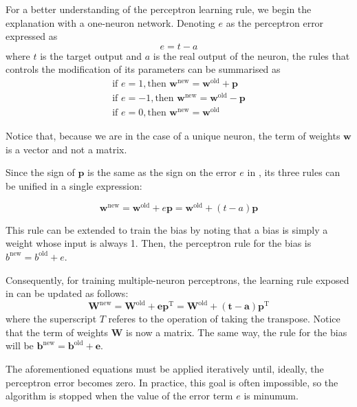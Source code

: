 For a better understanding of the perceptron learning rule, 
we begin the explanation with a one-neuron network. 
Denoting $e$ as the perceptron error expressed as
\begin{equation}
e=t-a
\end{equation}
where $t$ is the target output and $a$ is the real output of the neuron, the rules that controls the modification of its parameters can be summarised as \cite{Demuth:2014:NND:2721661}
\begin{equation}
\begin{align*}
\text{if } e=1,
\text{then } \mathbf{w}^{\text{new}} = \mathbf{w}^{\text{old}}+\mathbf{p}\\
\text{if } e=-1,
\text{then } \mathbf{w}^{\text{new}} = \mathbf{w}^{\text{old}}-\mathbf{p}\\
\text{if } e=0,
\text{then } \mathbf{w}^{\text{new}} = \mathbf{w}^{\text{old}}
\end{align*}
\label{eq:perceptron3rules}
\end{equation}

Notice that, because we are in the case of a unique neuron, the term of weights $\mathbf{w}$ is a vector and not a matrix. 

Since the sign of $\mathbf{p}$ is the same as the sign on the error $e$ in , its three rules can be unified in a single expression:

\begin{equation}
\mathbf{w}^{\text{new}} = \mathbf{w}^{\text{old}}+e\mathbf{p} = \mathbf{w}^{\text{old}}+(t-a)\mathbf{p}
\label{eq:perceptron1rule}
\end{equation}

This rule can be extended to train the bias by noting that a bias is simply a weight whose input is always 1.
Then, the perceptron rule for the bias is 
$b^{\text{new}}=b^{\text{old}}+e$.

Consequently, for training multiple-neuron perceptrons, the learning rule exposed in  can be updated as follows:
\begin{equation}
\mathbf{W}^{\text{new}} = \mathbf{W}^{\text{old}}+\mathbf{e}\mathbf{p}^{\text{T}} = \mathbf{W}^{\text{old}}+(\mathbf{t}-\mathbf{a})\mathbf{p}^{\text{T}}
\label{eq:perceptron1rule}
\end{equation}
where the superscript $T$ referes to the operation of taking the transpose. Notice that the term of weights $\mathbf{W}$ is now a matrix. The same way, the rule for the bias will be $\mathbf{b}^{\text{new}}=\mathbf{b}^{\text{old}}+\mathbf{e}$.

The aforementioned equations must be applied iteratively until, ideally, the perceptron error becomes zero. In practice, this goal is often impossible, so the algorithm is stopped when the value of the error term $e$ is minumum.



